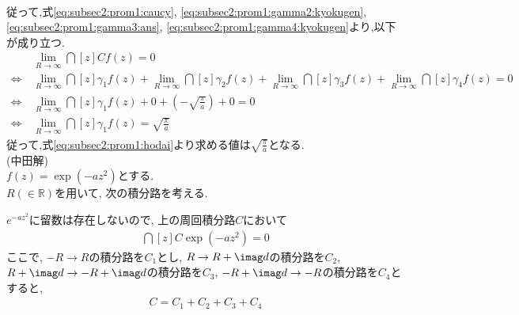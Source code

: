 \documentclass[dvipdfmx,titlepage, 11pt, a4paper]{jsarticle}%
\begin{document}
\begin{enumerate}[(1)]
\begin{align}
    \end{align}
    従って,式\eqref{eq:subsec2:prom1:caucy}, \eqref{eq:subsec2:prom1:gamma2:kyokugen}, 
    \eqref{eq:subsec2:prom1:gamma3:ans}, \eqref{eq:subsec2:prom1:gamma4:kyokugen}より,以下が成り立つ.
    \begin{align*}
        &\lim_{R \to \infty}\dint[z]{C}{}{f(z)} = 0\\
        \Longleftrightarrow\, &\lim_{R \to \infty} \dint[z]{\gamma_1}{}{f(z)} + \lim_{R \to \infty} \dint[z]{\gamma_2}{}{f(z)} + \lim_{R \to \infty} \dint[z]{\gamma_3}{}{f(z)}
         + \lim_{R \to \infty} \dint[z]{\gamma_4}{}{f(z)} = 0\\
        \Longleftrightarrow\, &\lim_{R \to \infty} \dint[z]{\gamma_1}{}{f(z)} + 0 + \left(-\sqrt{\frac{\pi}{a}}\right)
         + 0 = 0\\
        \Longleftrightarrow\, &\lim_{R \to \infty} \dint[z]{\gamma_1}{}{f(z)} = \sqrt{\frac{\pi}{a}}
    \end{align*}
    従って,式\eqref{eq:subsec2:prom1:hodai}より求める値は$\sqrt{\frac{\pi}{a}}$となる.\\[1cm]
    (中田解)\\
    $f(z)=\exp(-az^{2})$とする.\\
    $R(\in \mathbb{R})$を用いて, 次の積分路を考える.
    \begin{center}
    \end{center}
    $e^{-az^{2}}$に留数は存在しないので, 上の周回積分路$C$において
    \begin{eqnarray*}
        \dint[z]{C}{}{\exp(-az^{2})}=0 
    \end{eqnarray*}
    ここで, $-R\to R$の積分路を$C_{1}$とし, $R\to R+\imag d$の積分路を$C_{2}$, $R+\imag d\to -R+\imag d$の積分路を$C_{3}$, $-R+\imag d\to -R$の積分路を$C_{4}$とすると,
    \begin{eqnarray*}
        C = C_{1}+C_{2}+C_{3}+C_{4}

\end{eqnarray*}
\end{enumerate}
\end{document}
